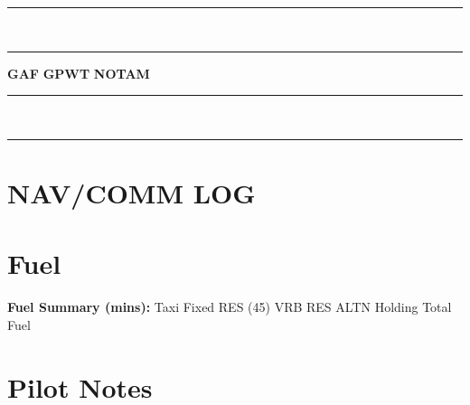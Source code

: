 \documentclass[a5paper,10pt]{article}
\newcommand{\checkbox}{\fbox{\rule{0pt}{0.3cm}\hspace{0.3cm}}}
\newcommand{\doubleline}{%
  \noindent\rule{\textwidth}{0.2pt}\\[-10pt]
  \noindent\rule{\textwidth}{0.2pt}%
}
\begin{document}
\vspace{0.3cm}

\doubleline
\vspace{0.3cm}
\begin{center}
    \textbf{GAF} \checkbox \hspace{1cm} \textbf{GPWT} \checkbox \hspace{1cm} \textbf{NOTAM} \checkbox
\end{center}
\par
\doubleline

\section*{NAV/COMM LOG}

\navcommlogtable

\section*{Fuel}

\noindent
\begin{minipage}[t]{7.3cm}
\end{minipage}
\hfill
\begin{minipage}[t]{7.3cm}
\end{minipage}

\vspace{0.5cm}
\noindent \textbf{Fuel Summary (mins):} Taxi \hspace{1.5cm} Fixed RES (45) \hspace{1.5cm} VRB RES \hspace{1.5cm} ALTN \hspace{1.5cm} Holding \hspace{1.5cm} Total Fuel

\vspace{0.5cm}
\section*{Pilot Notes}
\vspace{3cm}

\end{document}
